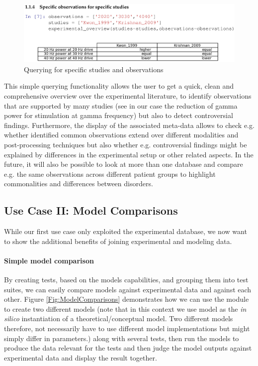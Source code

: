 \documentclass[a4paper,10pt]{article}
\begin{document}
\begin{figure}
\includegraphics[width=\textwidth]{Figures/specific_studies_and_observations}
\caption{Querying for specific studies and observations}
\label{Fig:ExpOverview2}
\end{figure}

This simple querying functionality allows the user to get a quick, clean and comprehensive overview over the experimental literature, to identify observations that are supported by many studies (see in our case the reduction of
gamma power for stimulation at gamma frequency) but also to detect controversial findings. Furthermore, the display of the associated meta-data allows to check e.g. whether identified common observations extend over
different modalities and post-processing techniques but also whether e.g. controversial findings might be explained by differences in the experimental setup or other related aspects. In the future, it will also be possible 
to look at more than one database and compare e.g. the same observations across different patient groups to highlight commonalities and differences between disorders.


\subsection{Use Case II: Model Comparisons}

While our first use case only exploited the experimental database, we now want to show the additional benefits of joining experimental and modeling data. 

\paragraph{Simple model comparison}
By creating tests, based on the models capabilities, and grouping 
them into test suites, we can easily compare models against experimental data and against each other. Figure \ref{Fig:ModelComparisons} demonstrates how we can use the module to create two different models (note that in this context
we use model as the \textit{in silico} instantiation of a theoretical/conceptual model. Two different models therefore, not necessarily have to use different model implementations but might simply differ in parameters.) along with
several tests, then run the models to produce the data relevant for the tests and then judge the model outputs against experimental data and  display the result together.
\end{document}
